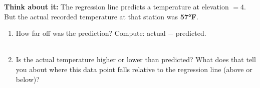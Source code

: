 \documentclass[10pt]{article}
\begin{document}
\begin{tcolorbox}[colback=greenbg, colframe=greenacc, boxrule=0.8pt, arc=2mm,
    left=4mm, right=4mm, top=3mm, bottom=3mm]
    \small
    \textbf{Think about it:} The regression line predicts a temperature at elevation $= 4$.
    But the actual recorded temperature at that station was \textbf{57°F}.
\end{tcolorbox}

\vspace{0.14in}

\begin{enumerate}[leftmargin=1.6em, itemsep=0.22in, start=4]

  \item How far off was the prediction? Compute: actual $-$ predicted.\\[8pt]
        \writeline\\[2pt]\writeline

  \item Is the actual temperature higher or lower than predicted? What does that tell you
        about where this data point falls relative to the regression line (above or below)?\\[8pt]
        \writeline\\[2pt]\writeline

\end{enumerate}
\end{document}
